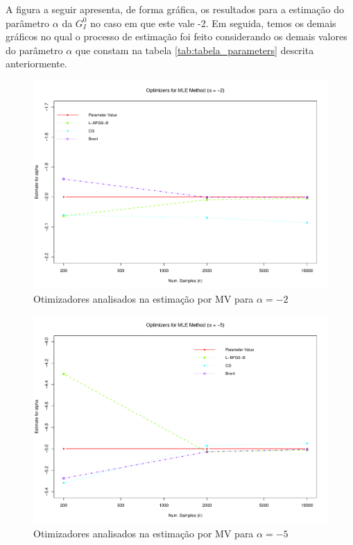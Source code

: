 \documentclass[12pt]{article}
\begin{document}
A figura a seguir apresenta, de forma gráfica, os resultados para a estimação do parâmetro $\alpha$ da $G_I^0$ no caso em que este vale -2. Em seguida, temos os demais gráficos no qual o processo de estimação foi feito considerando os demais valores do parâmetro $\alpha$ que constam na tabela \ref{tab:tabela_parameters} descrita anteriormente. 
\begin{figure}[H]
     \centering
     \includegraphics[scale=0.5]{plots/OptimsAlpha-2.pdf}
     \caption{Otimizadores analisados na estimação por MV para $\alpha = -2$}
     \label{graf_2}
\end{figure}
\begin{figure}[H]
     \centering
     \includegraphics[scale=0.5]{plots/OptimsAlpha-5.pdf}
     \caption{Otimizadores analisados na estimação por MV para $\alpha = -5$}
     \label{graf_3}
\end{figure}
\end{document}
